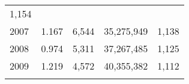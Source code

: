 \documentclass[]{book}
\theoremstyle{definition}
\theoremstyle{definition}
\theoremstyle{definition}
\theoremstyle{remark}
\begin{document}
\begin{longtable}[]{@{}lrrrr@{}}
\begin{minipage}[t]{0.16\columnwidth}
1,154\strut
\end{minipage}\tabularnewline
\begin{minipage}[t]{0.17\columnwidth}\raggedright\strut
2007\strut
\end{minipage} & \begin{minipage}[t]{0.14\columnwidth}\raggedleft\strut
1.167\strut
\end{minipage} & \begin{minipage}[t]{0.17\columnwidth}\raggedleft\strut
6,544\strut
\end{minipage} & \begin{minipage}[t]{0.16\columnwidth}\raggedleft\strut
35,275,949\strut
\end{minipage} & \begin{minipage}[t]{0.16\columnwidth}\raggedleft\strut
1,138\strut
\end{minipage}\tabularnewline
\begin{minipage}[t]{0.17\columnwidth}\raggedright\strut
2008\strut
\end{minipage} & \begin{minipage}[t]{0.14\columnwidth}\raggedleft\strut
0.974\strut
\end{minipage} & \begin{minipage}[t]{0.17\columnwidth}\raggedleft\strut
5,311\strut
\end{minipage} & \begin{minipage}[t]{0.16\columnwidth}\raggedleft\strut
37,267,485\strut
\end{minipage} & \begin{minipage}[t]{0.16\columnwidth}\raggedleft\strut
1,125\strut
\end{minipage}\tabularnewline
\begin{minipage}[t]{0.17\columnwidth}\raggedright\strut
2009\strut
\end{minipage} & \begin{minipage}[t]{0.14\columnwidth}\raggedleft\strut
1.219\strut
\end{minipage} & \begin{minipage}[t]{0.17\columnwidth}\raggedleft\strut
4,572\strut
\end{minipage} & \begin{minipage}[t]{0.16\columnwidth}\raggedleft\strut
40,355,382\strut
\end{minipage} & \begin{minipage}[t]{0.16\columnwidth}\raggedleft\strut
1,112\strut
\end{minipage}\tabularnewline
\begin{minipage}[t]{0.17\columnwidth}\raggedright\strut

\end{minipage}
\end{longtable}
\end{document}
